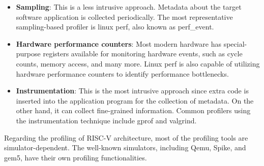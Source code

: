 \begin{itemize}
    \item \textbf{Sampling}: This is a less intrusive approach. Metadata about the target software application is collected periodically. The most representative sampling-based profiler is linux perf, also known as perf\_event\cite{de2010new}. 
    \item \textbf{Hardware performance counters}: Most modern hardware has special-purpose registers available for monitoring hardware events, such as cycle counts, memory access, and many more. Linux perf is also capable of utilizing hardware performance counters to identify performance bottlenecks\cite{weaver2013linux}.
    \item \textbf{Instrumentation}: This is the most intrusive approach since extra code is inserted into the application program for the collection of metadata. On the other hand, it can collect fine-grained information. Common profilers using the instrumentation technique include gprof\cite{graham1982gprof} and valgrind\cite{valgrind}.
\end{itemize}

Regarding the profiling of RISC-V architecture, most of the profiling tools are simulator-dependent. The well-known simulators, including Qemu\cite{banbury2021mlperf}, Spike\cite{spike_simulator}, and gem5\cite{binkert2011gem5}, have their own profiling functionalities.